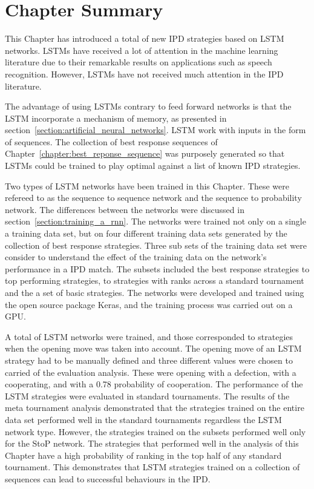 \section{Chapter Summary}

This Chapter has introduced a total of \lstmnetworks new IPD strategies based on
LSTM networks. LSTMs have received a lot of attention in the machine learning
literature due to their remarkable results on applications such as speech
recognition. However, LSTMs have not received much attention in the IPD
literature.

The advantage of using LSTMs contrary to feed forward networks is that the LSTM
incorporate a mechanism of memory, as presented in
section~\ref{section:artificial_neural_networks}. LSTM work with inputs in the
form of sequences. The collection of best response sequences of
Chapter~\ref{chapter:best_reponse_sequence} was purposely generated so that
LSTMs could be trained to play optimal against a list of known IPD strategies.

Two types of LSTM networks have been trained in this Chapter. These were
refereed to as the sequence to sequence network and the sequence to probability
network. The differences between the networks were discussed in
section~\ref{section:training_a_rnn}. The networks were trained not only on a
single a training data set, but on four different training data sets generated
by the collection of best response strategies. Three sub sets of the training
data set were consider to understand the effect of the training data on the
network's performance in a IPD match. The subsets included the best response
strategies to top performing strategies, to strategies with ranks across a
standard tournament and the a set of basic strategies. The networks were
developed and trained using the open source package Keras, and the training
process was carried out on a GPU.

A total of \lstmnetworks LSTM networks were trained, and those corresponded to
\lstmstrategies strategies when the opening move was taken into account. The
opening move of an LSTM strategy had to be manually defined and three different
values were chosen to carried of the evaluation analysis. These were opening
with a defection, with a cooperating, and with a 0.78 probability of
cooperation. The performance of the \lstmstrategies LSTM strategies were
evaluated in \metatournamentslstm standard tournaments. The results of the
meta tournament analysis demonstrated that the strategies trained on the entire
data set performed well in the \metatournamentslstm standard tournaments
regardless the LSTM network type. However, the strategies trained on the
subsets performed well only for the StoP network. The strategies that performed
well in the analysis of this Chapter have a high probability of ranking
in the top half of any standard tournament. This demonstrates that LSTM
strategies trained on a collection of sequences can lead to successful behaviours
in the IPD.

